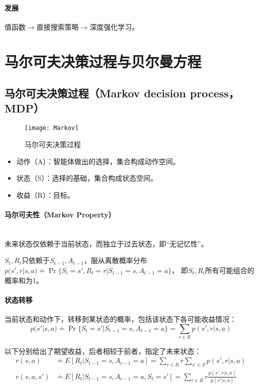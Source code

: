 \documentclass[
12pt, %
a4paper, 
oneside, %
headinclude,footinclude, %
]{scrartcl}
\begin{document}
\paragraph{发展}
值函数$ \rightarrow $直接搜索策略$ \rightarrow $深度强化学习。
\section{马尔可夫决策过程与贝尔曼方程}
\subsection{马尔可夫决策过程（Markov decision process，MDP）}
\begin{figure}[H]
\centering 
\texttt{[image: Markov]} 
\caption[马尔可夫决策过程]{马尔可夫决策过程}
\end{figure}

\begin{itemize}
\item 动作（A）：智能体做出的选择，集合构成动作空间。
\item 状态（S）：选择的基础，集合构成状态空间。
\item 收益（R）：目标。
\end{itemize}
\paragraph{马尔可夫性（Markov Property）}~\\

未来状态仅依赖于当前状态，而独立于过去状态，即“无记忆性”。

$ S_t,R_t $只依赖于$ S_{t-1},A_{t-1} $，服从离散概率分布
$ p(s', r|s, a) \doteq \Pr\{S_t = s', R_t = r|S_{t - 1} = s, A_{t - 1} = a\} $，
即$ S_t,R_t $所有可能组合的概率和为1。
\paragraph{状态转移}
当前状态和动作下，转移到某状态的概率，包括该状态下各可能收益情况：
$$
p(s'|s, a) \doteq \Pr\{S_t = s'|S_{t - 1} = s, A_{t - 1} = a\} = \sum_{r \in R} p(s', r|s, a)
$$

以下分别给出了期望收益，后者相较于前者，指定了未来状态：
\begin{align*}
r(s, a) &\doteq E[R_t|S_{t - 1} = s, A_{t - 1} = a] = \sum_{r \in R} r \sum_{s' \in S} p(s', r|s, a) \\
r(s, a, s') &\doteq E[R_t|S_{t - 1} = s, A_{t - 1} = a, S_t = s'] = \sum_{r \in R} r \frac{p(s', r|s, a)}{p(s'|s, a)}  
\end{align*}
\end{document}
